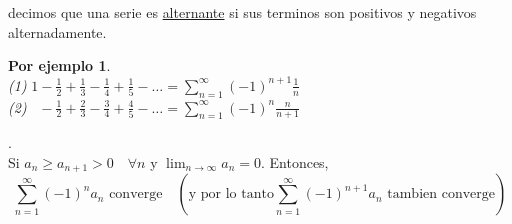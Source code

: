 \documentclass{article}
\theoremstyle{definition}
\theoremstyle{definition}
\newtheorem*{ej}{Por ejemplo}
\theoremstyle{remark}
\begin{document}
\begin{defi}
  decimos que una serie es \underline{alternante} si sus terminos son positivos y negativos alternadamente. 
\end{defi}


\begin{ej} \; \\
  \emph{(1)} \quad $1-\frac{1}{2} + \frac{1}{3} - \frac{1}{4}+\frac{1}{5} - \dots = \sum_{n=1}^{\infty}{(-1)^{n+1}\frac{1}{n}}$ \\
  \emph{(2)} \quad $\phantom{1}-\frac{1}{2}+\frac{2}{3}-\frac{3}{4}+\frac{4}{5}-\dots = \sum_{n=1}^{\infty}{(-1)^{n}\frac{n}{n+1}}$
\end{ej}

\pagebreak

\begin{teo}. \; \\
  Si $a_n \geq a_{n+1} > 0 \quad \forall n$ y $\lim_{n\to\infty}{a_n}=0$.   Entonces, $$\sum_{n=1}^{\infty}{(-1)^{n}a_n} \text{ converge} \quad (\text{y por lo tanto} \sum_{n=1}^{\infty}{(-1)^{n+1}a_n} \text{ tambien converge}) $$
\end{teo}

\begin{figure}[h]
\centering
\def\svgwidth{0.75\textwidth}

\end{figure}
\end{document}
